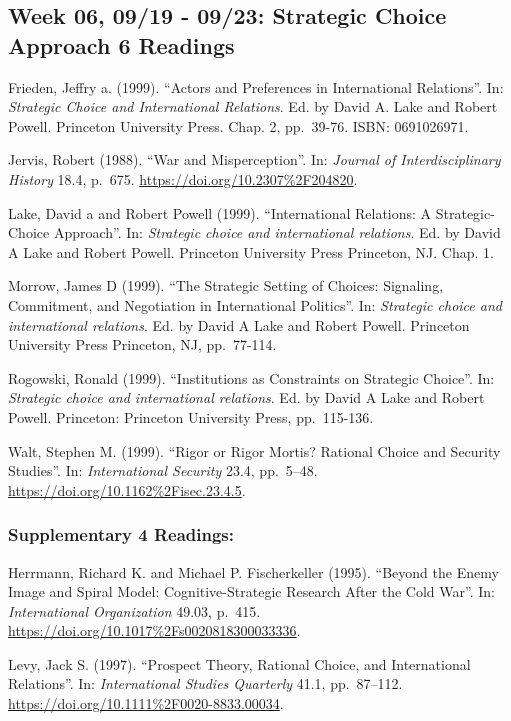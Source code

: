 \documentclass[10pt,]{article}
\begin{document}
\subsection{Week 06, 09/19 - 09/23: Strategic Choice Approach \textbar{}
6
Readings}\label{week-06-0919---0923-strategic-choice-approach-6-readings}

Frieden, Jeffry a. (1999). ``Actors and Preferences in International
Relations''. In: \emph{Strategic Choice and International Relations}.
Ed. by David A. Lake and Robert Powell. Princeton University Press.
Chap. 2, pp.~39-76. ISBN: 0691026971.

Jervis, Robert (1988). ``War and Misperception''. In:
\emph{Journal of Interdisciplinary History} 18.4, p.~675.
\url{https://doi.org/10.2307\%2F204820}.

Lake, David a and Robert Powell (1999). ``International Relations: A
Strategic-Choice Approach''. In:
\emph{Strategic choice and international relations}. Ed. by David A Lake
and Robert Powell. Princeton University Press Princeton, NJ. Chap. 1.

Morrow, James D (1999). ``The Strategic Setting of Choices: Signaling,
Commitment, and Negotiation in International Politics''. In:
\emph{Strategic choice and international relations}. Ed. by David A Lake
and Robert Powell. Princeton University Press Princeton, NJ, pp.~77-114.

Rogowski, Ronald (1999). ``Institutions as Constraints on Strategic
Choice''. In: \emph{Strategic choice and international relations}. Ed.
by David A Lake and Robert Powell. Princeton: Princeton University
Press, pp.~115-136.

Walt, Stephen M. (1999). ``Rigor or Rigor Mortis? Rational Choice and
Security Studies''. In: \emph{International Security} 23.4, pp.~5--48.
\url{https://doi.org/10.1162\%2Fisec.23.4.5}.

\subsubsection{Supplementary \textbar{} 4
Readings:}\label{supplementary-4-readings}

Herrmann, Richard K. and Michael P. Fischerkeller (1995). ``Beyond the
Enemy Image and Spiral Model: Cognitive-Strategic Research After the
Cold War''. In: \emph{International Organization} 49.03, p.~415.
\url{https://doi.org/10.1017\%2Fs0020818300033336}.

Levy, Jack S. (1997). ``Prospect Theory, Rational Choice, and
International Relations''. In: \emph{International Studies Quarterly}
41.1, pp.~87--112. \url{https://doi.org/10.1111\%2F0020-8833.00034}.
\end{document}
